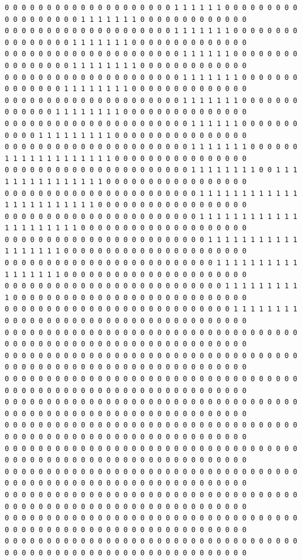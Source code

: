 \documentclass{oci}
\begin{document}
\begin{sampleDescription}
{\begin{verbatim}
0 0 0 0 0 0 0 0 0 0 0 0 0 0 0 0 0 0 0 0 1 1 1 1 1 1 0 0 0 0 0 0 0 0 0 0 0 0 0 0 0 0 0 0 1 1 1 1 1 1 1 0 0 0 0 0 0 0 0 0 0 0 0 0
0 0 0 0 0 0 0 0 0 0 0 0 0 0 0 0 0 0 0 0 1 1 1 1 1 1 1 0 0 0 0 0 0 0 0 0 0 0 0 0 0 0 0 1 1 1 1 1 1 1 0 0 0 0 0 0 0 0 0 0 0 0 0 0
0 0 0 0 0 0 0 0 0 0 0 0 0 0 0 0 0 0 0 0 0 1 1 1 1 1 1 0 0 0 0 0 0 0 0 0 0 0 0 0 0 0 0 1 1 1 1 1 1 1 1 0 0 0 0 0 0 0 0 0 0 0 0 0
0 0 0 0 0 0 0 0 0 0 0 0 0 0 0 0 0 0 0 0 0 1 1 1 1 1 1 1 0 0 0 0 0 0 0 0 0 0 0 0 0 0 1 1 1 1 1 1 1 1 0 0 0 0 0 0 0 0 0 0 0 0 0 0
0 0 0 0 0 0 0 0 0 0 0 0 0 0 0 0 0 0 0 0 0 1 1 1 1 1 1 1 0 0 0 0 0 0 0 0 0 0 0 0 0 1 1 1 1 1 1 1 1 0 0 0 0 0 0 0 0 0 0 0 0 0 0 0
0 0 0 0 0 0 0 0 0 0 0 0 0 0 0 0 0 0 0 0 0 0 1 1 1 1 1 1 0 0 0 0 0 0 0 0 0 0 0 1 1 1 1 1 1 1 1 1 0 0 0 0 0 0 0 0 0 0 0 0 0 0 0 0
0 0 0 0 0 0 0 0 0 0 0 0 0 0 0 0 0 0 0 0 0 0 1 1 1 1 1 1 1 0 0 0 0 0 0 1 1 1 1 1 1 1 1 1 1 1 1 1 0 0 0 0 0 0 0 0 0 0 0 0 0 0 0 0
0 0 0 0 0 0 0 0 0 0 0 0 0 0 0 0 0 0 0 0 0 0 1 1 1 1 1 1 1 1 0 0 1 1 1 1 1 1 1 1 1 1 1 1 1 1 1 0 0 0 0 0 0 0 0 0 0 0 0 0 0 0 0 0
0 0 0 0 0 0 0 0 0 0 0 0 0 0 0 0 0 0 0 0 0 0 0 1 1 1 1 1 1 1 1 1 1 1 1 1 1 1 1 1 1 1 1 1 1 1 0 0 0 0 0 0 0 0 0 0 0 0 0 0 0 0 0 0
0 0 0 0 0 0 0 0 0 0 0 0 0 0 0 0 0 0 0 0 0 0 0 1 1 1 1 1 1 1 1 1 1 1 1 1 1 1 1 1 1 1 1 1 0 0 0 0 0 0 0 0 0 0 0 0 0 0 0 0 0 0 0 0
0 0 0 0 0 0 0 0 0 0 0 0 0 0 0 0 0 0 0 0 0 0 0 0 1 1 1 1 1 1 1 1 1 1 1 1 1 1 1 1 1 1 0 0 0 0 0 0 0 0 0 0 0 0 0 0 0 0 0 0 0 0 0 0
0 0 0 0 0 0 0 0 0 0 0 0 0 0 0 0 0 0 0 0 0 0 0 0 0 1 1 1 1 1 1 1 1 1 1 1 1 1 1 1 1 1 0 0 0 0 0 0 0 0 0 0 0 0 0 0 0 0 0 0 0 0 0 0
0 0 0 0 0 0 0 0 0 0 0 0 0 0 0 0 0 0 0 0 0 0 0 0 0 0 1 1 1 1 1 1 1 1 1 1 0 0 0 0 0 0 0 0 0 0 0 0 0 0 0 0 0 0 0 0 0 0 0 0 0 0 0 0
0 0 0 0 0 0 0 0 0 0 0 0 0 0 0 0 0 0 0 0 0 0 0 0 0 0 0 1 1 1 1 1 1 1 1 0 0 0 0 0 0 0 0 0 0 0 0 0 0 0 0 0 0 0 0 0 0 0 0 0 0 0 0 0
0 0 0 0 0 0 0 0 0 0 0 0 0 0 0 0 0 0 0 0 0 0 0 0 0 0 0 0 0 0 0 0 0 0 0 0 0 0 0 0 0 0 0 0 0 0 0 0 0 0 0 0 0 0 0 0 0 0 0 0 0 0 0 0
0 0 0 0 0 0 0 0 0 0 0 0 0 0 0 0 0 0 0 0 0 0 0 0 0 0 0 0 0 0 0 0 0 0 0 0 0 0 0 0 0 0 0 0 0 0 0 0 0 0 0 0 0 0 0 0 0 0 0 0 0 0 0 0
0 0 0 0 0 0 0 0 0 0 0 0 0 0 0 0 0 0 0 0 0 0 0 0 0 0 0 0 0 0 0 0 0 0 0 0 0 0 0 0 0 0 0 0 0 0 0 0 0 0 0 0 0 0 0 0 0 0 0 0 0 0 0 0
0 0 0 0 0 0 0 0 0 0 0 0 0 0 0 0 0 0 0 0 0 0 0 0 0 0 0 0 0 0 0 0 0 0 0 0 0 0 0 0 0 0 0 0 0 0 0 0 0 0 0 0 0 0 0 0 0 0 0 0 0 0 0 0
0 0 0 0 0 0 0 0 0 0 0 0 0 0 0 0 0 0 0 0 0 0 0 0 0 0 0 0 0 0 0 0 0 0 0 0 0 0 0 0 0 0 0 0 0 0 0 0 0 0 0 0 0 0 0 0 0 0 0 0 0 0 0 0
0 0 0 0 0 0 0 0 0 0 0 0 0 0 0 0 0 0 0 0 0 0 0 0 0 0 0 0 0 0 0 0 0 0 0 0 0 0 0 0 0 0 0 0 0 0 0 0 0 0 0 0 0 0 0 0 0 0 0 0 0 0 0 0
0 0 0 0 0 0 0 0 0 0 0 0 0 0 0 0 0 0 0 0 0 0 0 0 0 0 0 0 0 0 0 0 0 0 0 0 0 0 0 0 0 0 0 0 0 0 0 0 0 0 0 0 0 0 0 0 0 0 0 0 0 0 0 0
0 0 0 0 0 0 0 0 0 0 0 0 0 0 0 0 0 0 0 0 0 0 0 0 0 0 0 0 0 0 0 0 0 0 0 0 0 0 0 0 0 0 0 0 0 0 0 0 0 0 0 0 0 0 0 0 0 0 0 0 0 0 0 0
0 0 0 0 0 0 0 0 0 0 0 0 0 0 0 0 0 0 0 0 0 0 0 0 0 0 0 0 0 0 0 0 0 0 0 0 0 0 0 0 0 0 0 0 0 0 0 0 0 0 0 0 0 0 0 0 0 0 0 0 0 0 0 0
0 0 0 0 0 0 0 0 0 0 0 0 0 0 0 0 0 0 0 0 0 0 0 0 0 0 0 0 0 0 0 0 0 0 0 0 0 0 0 0 0 0 0 0 0 0 0 0 0 0 0 0 0 0 0 0 0 0 0 0 0 0 0 0
\end{verbatim}
}


\end{sampleDescription}
\end{document}
